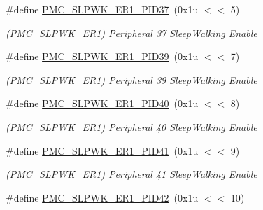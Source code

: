 \begin{DoxyCompactItemize}
\mbox{\label{group__SAMS70__PMC_ga69f970e7ea026d4b22a1ca182c755bb8}} 
\#define \mbox{\hyperlink{group__SAMS70__PMC_ga69f970e7ea026d4b22a1ca182c755bb8}{P\+M\+C\+\_\+\+S\+L\+P\+W\+K\+\_\+\+E\+R1\+\_\+\+P\+I\+D37}}~(0x1u $<$$<$ 5)
\begin{DoxyCompactList}\small\item\em (P\+M\+C\+\_\+\+S\+L\+P\+W\+K\+\_\+\+E\+R1) Peripheral 37 Sleep\+Walking Enable \end{DoxyCompactList}\item 
\mbox{\label{group__SAMS70__PMC_gaf0e4fb57be2f5ebbe3e27183a3ed8c40}} 
\#define \mbox{\hyperlink{group__SAMS70__PMC_gaf0e4fb57be2f5ebbe3e27183a3ed8c40}{P\+M\+C\+\_\+\+S\+L\+P\+W\+K\+\_\+\+E\+R1\+\_\+\+P\+I\+D39}}~(0x1u $<$$<$ 7)
\begin{DoxyCompactList}\small\item\em (P\+M\+C\+\_\+\+S\+L\+P\+W\+K\+\_\+\+E\+R1) Peripheral 39 Sleep\+Walking Enable \end{DoxyCompactList}\item 
\mbox{\label{group__SAMS70__PMC_gabef08907d93b2e1f0bc8706673cf5075}} 
\#define \mbox{\hyperlink{group__SAMS70__PMC_gabef08907d93b2e1f0bc8706673cf5075}{P\+M\+C\+\_\+\+S\+L\+P\+W\+K\+\_\+\+E\+R1\+\_\+\+P\+I\+D40}}~(0x1u $<$$<$ 8)
\begin{DoxyCompactList}\small\item\em (P\+M\+C\+\_\+\+S\+L\+P\+W\+K\+\_\+\+E\+R1) Peripheral 40 Sleep\+Walking Enable \end{DoxyCompactList}\item 
\mbox{\label{group__SAMS70__PMC_ga5e45794d9cd85a7239f619bd39719ec3}} 
\#define \mbox{\hyperlink{group__SAMS70__PMC_ga5e45794d9cd85a7239f619bd39719ec3}{P\+M\+C\+\_\+\+S\+L\+P\+W\+K\+\_\+\+E\+R1\+\_\+\+P\+I\+D41}}~(0x1u $<$$<$ 9)
\begin{DoxyCompactList}\small\item\em (P\+M\+C\+\_\+\+S\+L\+P\+W\+K\+\_\+\+E\+R1) Peripheral 41 Sleep\+Walking Enable \end{DoxyCompactList}\item 
\mbox{\label{group__SAMS70__PMC_ga69395c66e87ccc2b25a2981d6be95608}} 
\#define \mbox{\hyperlink{group__SAMS70__PMC_ga69395c66e87ccc2b25a2981d6be95608}{P\+M\+C\+\_\+\+S\+L\+P\+W\+K\+\_\+\+E\+R1\+\_\+\+P\+I\+D42}}~(0x1u $<$$<$ 10)
$$
\end{DoxyCompactItemize}
